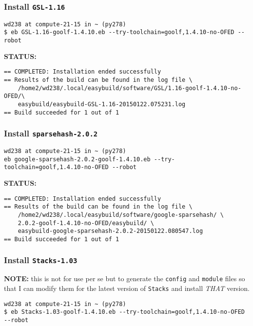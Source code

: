 \documentclass[letterpaper]{scrartcl}
\begin{document}
\subsubsection{Install \texttt{GSL-1.16}}\label{install-gsl-1.16}

\begin{verbatim}
wd238 at compute-21-15 in ~ (py278) 
$ eb GSL-1.16-goolf-1.4.10.eb --try-toolchain=goolf,1.4.10-no-OFED --robot
\end{verbatim}

\textbf{STATUS:}

\begin{verbatim}
== COMPLETED: Installation ended successfully
== Results of the build can be found in the log file \
    /home2/wd238/.local/easybuild/software/GSL/1.16-goolf-1.4.10-no-OFED/\
    easybuild/easybuild-GSL-1.16-20150122.075231.log
== Build succeeded for 1 out of 1
\end{verbatim}

\subsubsection{Install
\texttt{sparsehash-2.0.2}}\label{install-sparsehash-2.0.2}

\begin{verbatim}
wd238 at compute-21-15 in ~ (py278)
eb google-sparsehash-2.0.2-goolf-1.4.10.eb --try-toolchain=goolf,1.4.10-no-OFED --robot
\end{verbatim}

\textbf{STATUS:}

\begin{verbatim}
== COMPLETED: Installation ended successfully
== Results of the build can be found in the log file \
    /home2/wd238/.local/easybuild/software/google-sparsehash/ \
    2.0.2-goolf-1.4.10-no-OFED/easybuild/ \
    easybuild-google-sparsehash-2.0.2-20150122.080547.log
== Build succeeded for 1 out of 1
\end{verbatim}

\subsubsection{Install \texttt{Stacks-1.03}}\label{install-stacks-1.03}

\textbf{NOTE:} this is not for use per se but to generate the
\texttt{config} and \texttt{module} files so that I can modify them for
the latest version of \texttt{Stacks} and install \emph{THAT} version.

\begin{verbatim}
wd238 at compute-21-15 in ~ (py278) 
$ eb Stacks-1.03-goolf-1.4.10.eb --try-toolchain=goolf,1.4.10-no-OFED --robot
\end{verbatim}
\end{document}
